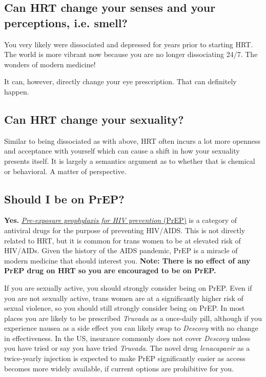 \documentclass{article}
\begin{document}
\subsection{Can HRT change your senses and your perceptions, i.e. smell?}

You very likely were dissociated and depressed for years prior to starting HRT. The world is more vibrant now because you are no longer dissociating 24/7. The wonders of modern medicine!

It can, however, directly change your eye prescription. That can definitely happen.

\subsection{Can HRT change your sexuality?}

Similar to being dissociated as with above, HRT often incurs a lot more openness and acceptance with yourself which can cause a shift in how your sexuality presents itself. It is largely a semantics argument as to whether that is chemical or behavioral. A matter of perspective.

\subsection{Should I be on PrEP?}\label{11-25}

\textbf{Yes.} \href{https://en.wikipedia.org/wiki/Pre-exposure_prophylaxis_for_HIV_prevention}{\textit{Pre-exposure prophylaxis for HIV prevention} (PrEP)} is a category of antiviral drugs for the purpose of preventing HIV/AIDS. This is not directly related to HRT, but it is common for trans women to be at elevated risk of HIV/AIDs. Given the history of the AIDS pandemic, PrEP is a miracle of modern medicine that should interest you. \textbf{Note: There is no effect of any PrEP drug on HRT so you are encouraged to be on PrEP.}

If you are sexually active, you should strongly consider being on PrEP. Even if you are not sexually active, trans women are at a significantly higher risk of sexual violence, so you should still strongly consider being on PrEP. In most places you are likely to be prescribed \textit{Truvada} as a once-daily pill, although if you experience nausea as a side effect you can likely swap to \textit{Descovy} with no change in effectiveness. In the US, insurance commonly does not cover \textit{Descovy} unless you have tried or say you have tried \textit{Truvada}. The novel drug \textit{lenacapavir} as a twice-yearly injection is expected to make PrEP significantly easier as access becomes more widely available, if current options are prohibitive for you.
\end{document}
